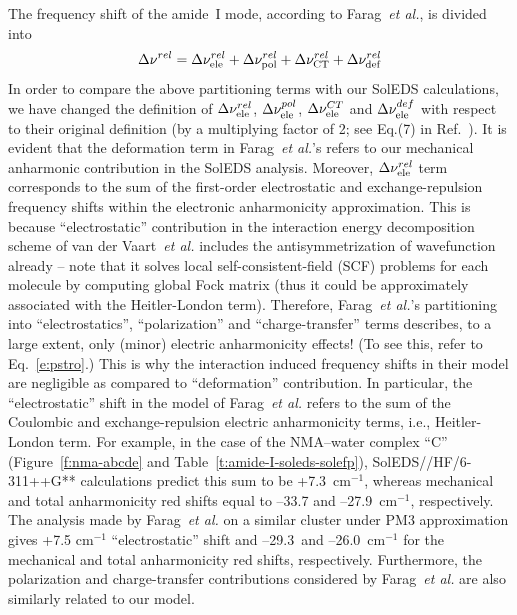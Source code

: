 \documentclass[a4paper,titlepage,twoside,fleqn,12pt]{book}
\begin{document}
\begin{refsection}
The frequency shift of the amide~I mode, according to Farag~\emph{et al.}, is divided into
%
\begin{equation} \label{e:cooo2}
 \Delta\nu^{rel} =  \Delta\nu_{\rm ele}^{rel} +
                    \Delta\nu_{\rm pol}^{rel} +
                    \Delta\nu_{\rm CT}^{rel} +
                    \Delta\nu_{\rm def}^{rel}
\end{equation}
%
In order to compare the above partitioning terms with our SolEDS calculations, we have
changed the definition of $\Delta\nu_{\rm ele}^{rel}$, $\Delta\nu_{\rm ele}^{pol}$,
$\Delta\nu_{\rm ele}^{CT}$ and $\Delta\nu_{\rm ele}^{def}$ with respect to their 
original definition (by a multiplying factor of 2; see Eq.(7) 
in Ref.~\citep{Farag.Ruiz-Lopez.Bastida.Monard.Ingrosso.JPCB.2015}). 
It is evident that the deformation term in Farag~\emph{et al.}'s 
refers to our mechanical anharmonic contribution in the SolEDS analysis.
Moreover, $\Delta\nu_{\rm ele}^{rel}$ term corresponds to the sum of the 
first\hyp{}order electrostatic and exchange\hyp{}repulsion frequency shifts 
within the electronic anharmonicity approximation. This is because 
``electrostatic'' contribution in the interaction energy decomposition 
scheme of van der Vaart~\emph{et al.} \citep{vanderVaart.Merz.JPCA.1999}  
includes the antisymmetrization of wavefunction 
already -- note that it solves local self\hyp{}consistent\hyp{}field (SCF) 
problems for each molecule by computing global Fock matrix 
(thus it could be approximately associated with the Heitler\hyp{}London term). 
Therefore, Farag~\emph{et al.}'s partitioning into
``electrostatics'', ``polarization'' and ``charge\hyp{}transfer” terms
describes, to a large extent, only (minor) electric anharmonicity
effects! (To see this, refer to Eq.~\eqref{e:pstro}.) This is
why the interaction induced frequency shifts in their model
are negligible as compared to ``deformation'' contribution.
In particular, the ``electrostatic'' shift in the model of Farag~\emph{et al.}
refers to the sum of the Coulombic and exchange\hyp{}repulsion
electric anharmonicity terms, i.e., Heitler\hyp{}London
term. For example, in the case of the NMA--water complex ``C''
(Figure~\ref{f:nma-abcde} and Table~\ref{t:amide-I-soleds-solefp}), 
SolEDS//HF/6-311++G** calculations predict
this sum to be +7.3~cm$^{-1}$, whereas mechanical and total
anharmonicity red shifts equal to --33.7 and --27.9~cm$^{-1}$,
respectively. The analysis made by Farag~\emph{et al.} on a similar
cluster under PM3 approximation \citep{Stewart.JCC.1988} 
gives +7.5 cm$^{-1}$ ``electrostatic''
shift and --29.3~and --26.0~cm$^{-1}$ for the mechanical and
total anharmonicity red shifts, respectively. Furthermore, the
polarization and charge\hyp{}transfer contributions considered by
Farag~\emph{et al.} are also similarly related to our model. 


\end{refsection}
\end{document}
